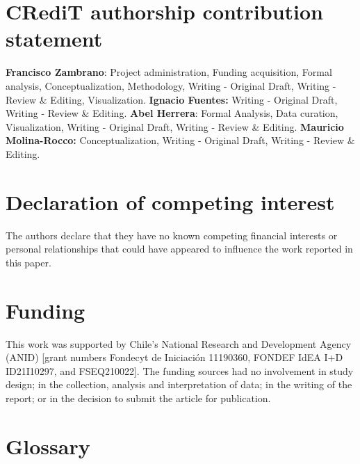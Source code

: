 \documentclass[
  english,
  review,
  number,
  sort,compress,
  authoryear,
  3p]{elsarticle}
\begin{document}
\section*{CRediT authorship contribution
statement}\label{credit-authorship-contribution-statement}

\textbf{Francisco Zambrano}: Project administration, Funding
acquisition, Formal analysis, Conceptualization, Methodology, Writing -
Original Draft, Writing - Review \& Editing, Visualization.
\textbf{Ignacio Fuentes:} Writing - Original Draft, Writing - Review \&
Editing. \textbf{Abel Herrera}: Formal Analysis, Data curation,
Visualization, Writing - Original Draft, Writing - Review \& Editing.
\textbf{Mauricio Molina-Rocco:} Conceptualization, Writing - Original
Draft, Writing - Review \& Editing.

\section*{Declaration of competing
interest}\label{declaration-of-competing-interest}

The authors declare that they have no known competing financial
interests or personal relationships that could have appeared to
influence the work reported in this paper.

\section*{Funding}\label{funding}

This work was supported by Chile's National Research and Development
Agency (ANID) {[}grant numbers Fondecyt de Iniciación 11190360, FONDEF
IdEA I+D ID21I10297, and FSEQ210022{]}. The funding sources had no
involvement in study design; in the collection, analysis and
interpretation of data; in the writing of the report; or in the decision
to submit the article for publication.

\section*{Glossary}\label{glossary}
\end{document}
